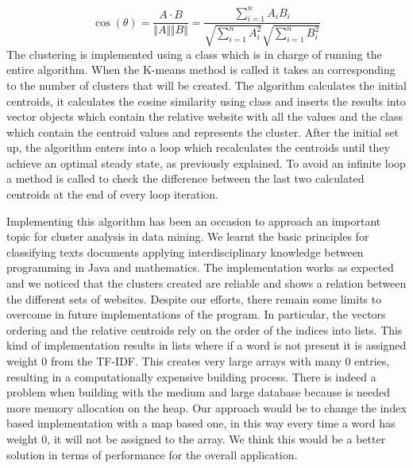 $$
\cos(\theta) = \frac{A \cdot B}{\Vert A \Vert \Vert B \Vert} = \frac{\sum_{i=1}^n A_iB_i}{\sqrt{\sum_{i=1}^n A_i^2}{\sqrt{\sum_{i=1}^n B_i^2}}}
$$
The clustering is implemented using a  class which is in charge of running the entire algorithm. When the K-means method is called it takes an  corresponding to the number of clusters that will be created. The algorithm calculates the initial centroids, it calculates the cosine similarity using  class and inserts the results into vector objects which contain the relative website with all the values and the  class which contain the centroid values and represents the cluster. After the initial set up, the algorithm enters into a loop which recalculates the centroids until they achieve an optimal steady state, as previously explained. To avoid an infinite loop a method is called to check the difference between the last two calculated centroids at the end of every loop iteration.

Implementing this algorithm has been an occasion to approach an important topic for cluster analysis in data mining. We learnt the basic principles for classifying texts documents applying interdisciplinary knowledge between programming in Java and mathematics.
The implementation works as expected and we noticed that the clusters created are reliable and shows a relation between the different sets of websites.
Despite our efforts, there remain some limits to overcome in future implementations of the program. In particular, the vectors ordering and the relative centroids rely on the order of the indices into lists. This kind of implementation results in lists where if a word is not present it is assigned weight $0$ from the TF-IDF. This creates very large arrays with many $0$ entries, resulting in a computationally expensive building process. There is indeed a problem when building with the medium and large database because is needed more memory allocation on the heap.
Our approach would be to change the index based implementation with a map based one, in this way every time a word has weight $0$, it will not be assigned to the array. We think this would be a better solution in terms of performance for the overall application.

